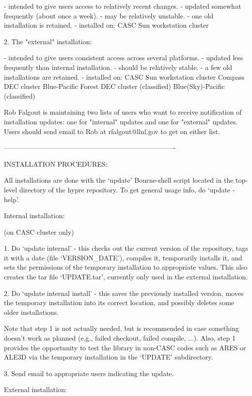 \documentclass{article}
\begin{document}
\begin{cxxentry}
\begin{cxxdoc}
- intended to give users access to relatively recent changes.
- updated somewhat frequently (about once a week).
- may be relatively unstable.
- one old installation is retained.
- installed on:
CASC Sun workstation cluster

2. The "external" installation:

- intended to give users consistent access across several platforms.
- updated less frequently than internal installation.
- should be relatively stable.
- a few old installations are retained.
- installed on:
CASC Sun workstation cluster
Compass DEC cluster
Blue-Pacific
Forest DEC cluster  (classified)
Blue(Sky)-Pacific   (classified)

Rob Falgout is maintaining two lists of users who want to receive
notification of installation updates: one for "internal" updates and
one for "external" updates.  Users should send email to Rob at
rfalgout@llnl.gov to get on either list.

----------------------------------------------------------------------------

INSTALLATION PROCEDURES:

All installations are done with the `update' Bourne-shell script
located in the top-level directory of the hypre repository.  To
get general usage info, do `update -help'.

Internal installation:

(on CASC cluster only)

1. Do `update internal' - this checks out the current version of the
repository, tags it with a date (file `VERSION_DATE'), compiles it,
temporarily installs it, and sets the permissions of the temporary
installation to appropriate values.  This also creates the tar file
`UPDATE.tar', currently only used in the external installation.

2. Do `update internal install' - this saves the previously
installed version, moves the temporary installation into its
correct location, and possibly deletes some older installations.

Note that step 1 is not actually needed, but is recommended in case
something doesn't work as planned (e.g., failed checkout, failed
compile, ...).  Also, step 1 provides the opportunity to test the
library in non-CASC codes such as ARES or ALE3D via the temporary
installation in the `UPDATE' subdirectory.

3. Send email to appropriate users indicating the update.

External installation:


\end{cxxdoc}
\end{cxxentry}
\end{document}
